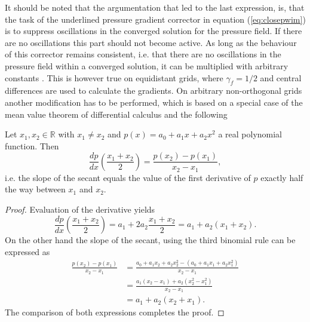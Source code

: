 It should be noted that the argumentation that led to the last expression, is, that the task of the underlined pressure gradient corrector in equation (\ref{eq:closepwim}) is to suppress oscillations in the converged solution for the pressure field. If there are no oscillations this part should not become active. As long as the behaviour of this corrector remains consistent, i.e. that there are no oscillations in the pressure field within a converged solution, it can be multiplied with arbitrary constants \cite{ferziger02}. This is however true on equidistant grids, where \(\gamma_f = 1/2\) and central differences are used to calculate the gradients. On arbitrary non-orthogonal grids another modification has to be performed, which is based on a special case of the mean value theorem of differential calculus and the following 
\begin{prop}
  Let \(x_1,x_2 \in \mathbb{R}\) with \(x_1 \neq x_2\) and \(p(x) = a_0 + a_1 x + a_2 x^2\) a real polynomial function. Then 
  \begin{displaymath}
    \frac{dp}{dx}\left(\frac{x_1+x_2}{2}\right) = \frac{p(x_2) - p(x_1)}{x_2 - x_1},
  \end{displaymath}
  i.e. the slope of the secant equals the value of the first derivative of \(p\) exactly half the way between \(x_1\) and \(x_2\).
\end{prop}

\begin{proof}
Evaluation of the derivative yields
\begin{displaymath}
    \frac{dp}{dx}\left(\frac{x_1+x_2}{2}\right) = a_1 + 2 a_2 \frac{x_1 + x_2}{2} = a_1 + a_2(x_1 + x_2).
\end{displaymath}
On the other hand the slope of the secant, using the third binomial rule can be expressed as
\begin{displaymath}
  \begin{array}{ll}
  \frac{p(x_2) - p(x_1)}{x_2 - x_1} 
&= \frac{a_0 + a_1 x_2 + a_2 x_2^2 - \left(a_0 + a_1 x_1 + a_2 x_1 ^2\right)}{x_2 - x_1} \\[1.0em]
  \quad &= \frac{a_1 (x_2 - x_1) + a_2 \left(x_2^2 - x_1^2\right)}{x_2 - x_1} \\[1.0em]
  \quad &= a_1 + a_2 (x_2 + x_1).
\end{array}
\end{displaymath}
The comparison of both expressions completes the proof.
\end{proof}

